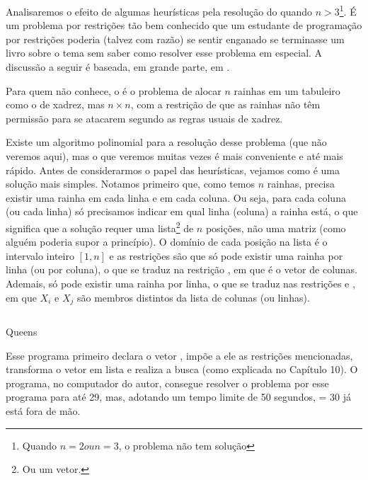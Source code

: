 \documentclass{article}
\begin{document}
Analisaremos o efeito de algumas heurísticas pela resolução do  quando $n > 3$\footnote{Quando $n = 2 ou n = 3$, o problema não tem solução}. É um
problema por restrições tão bem conhecido que um estudante de programação por
restrições poderia (talvez com razão) se sentir enganado se terminasse um livro sobre o tema sem saber
como resolver esse problema em especial. A discussão a seguir é baseada, em grande parte, em
\cite{krzysztof}.

Para quem não conhece, o  é o problema de alocar $n$ rainhas em um
tabuleiro como o de xadrez, mas $n\times n$, com a restrição de que as rainhas não têm permissão
para se atacarem segundo as regras usuais de xadrez.

Existe um algoritmo polinomial para a resolução desse problema (que não veremos aqui), mas o que
veremos muitas vezes é mais conveniente e até mais rápido. Antes de considerarmos o papel das
heurísticas, vejamos como é uma solução mais simples. Notamos primeiro que, como temos $n$ rainhas,
precisa existir uma rainha em cada linha e em cada coluna. Ou seja, para cada coluna (ou cada linha)
só precisamos indicar em qual linha (coluna) a rainha está, o que significa que a solução requer uma
lista\footnote{Ou um vetor.} de $n$ posições, não uma matriz (como alguém poderia supor a princípio). O domínio de cada
posição na lista é o intervalo inteiro $[1,n]$ e as restrições são que só pode existir uma rainha
por linha (ou por coluna), o que se traduz na restrição , em que
 é o vetor de colunas. Ademais, só pode existir uma rainha por linha, o que se traduz nas
restrições  e , em que $X_i$ e $X_j$ são membros distintos da lista de colunas (ou linhas).

    \begin{listing}[H]
    \inputminted{prolog}{../Exemplos/Cap11/prog1_queens.ecl}
    \caption{Queens}
    \end{listing}

Esse programa primeiro declara o vetor , impõe a ele as restrições mencionadas,
transforma o vetor em lista e realiza a busca (como explicada no Capítulo 10).%
O programa, no computador do autor, consegue resolver o problema por esse programa para  até 29,
mas, adotando um tempo limite de 50 segundos,  = 30 já está fora de mão.
\end{document}
